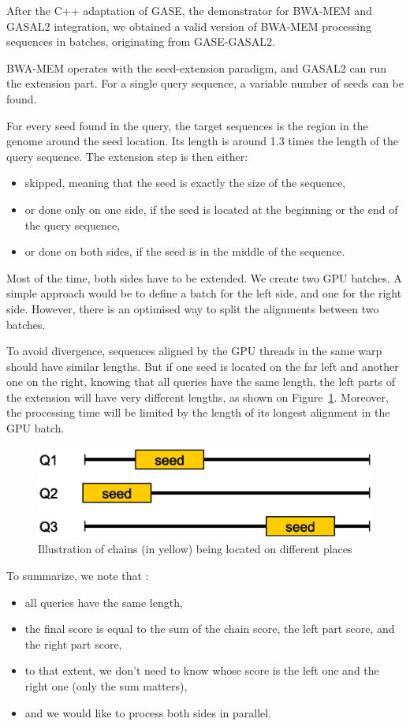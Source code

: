 After the C++ adaptation of GASE, the demonstrator for BWA-MEM and GASAL2 integration, we obtained a valid version of BWA-MEM processing sequences in batches, originating from GASE-GASAL2.

BWA-MEM operates with the seed-extension paradigm, and GASAL2 can run the extension part. For a single query sequence, a variable number of seeds can be found. 

For every seed found in the query, the target sequences is the region in the genome around the seed location. Its length is around 1.3 times the length of the query sequence. The extension step is then either:

\begin{itemize}
	\item skipped, meaning that the seed is exactly the size of the sequence,
	\item or done only on one side, if the seed is located at the beginning or the end of the query sequence,
	\item or done on both sides, if the seed is in the middle of the sequence.
\end{itemize}

Most of the time, both sides have to be extended. We create two GPU batches. A simple approach would be to define a batch for the left side, and one for the right side. However, there is an optimised way to split the alignments between two batches.

To avoid divergence, sequences aligned by the GPU threads in the same warp should have similar lengths.  But if one seed is located on the far left and another one on the right, knowing that all queries have the same length, the left parts of the extension will have very different lengths, as shown on Figure~\ref{fig:seds-different-chains}. Moreover, the processing time will be limited by the length of its longest alignment in the GPU batch.
\begin{figure}[h!]
	\centering
	\includegraphics[width=0.7\linewidth]{seds-different-chains}
	\caption{Illustration of chains (in yellow) being located on different places}
	\label{fig:seds-different-chains}
\end{figure}

To summarize, we note that :
\begin{itemize}
	\item all queries have the same length,
	\item the final score is equal to the sum of the chain score, the left part score, and the right part score,
	\item to that extent, we don't need to know whose score is the left one and the right one (only the sum matters),
	\item and we would like to process both sides in parallel.
\end{itemize}

